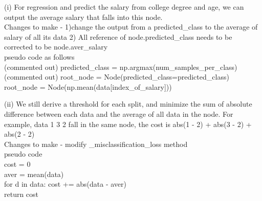 \begin{answer}

(i) 
For regression and predict the salary from college degree and age, we can output the average salary that falls into this node. \\

Changes to make - 1)change the output from a predicted\_class to the average of salary of all its data 2) All reference of node.predicted\_class needs to be corrected to be node.aver\_salary \\
pseudo code as follows\\
    \hspace{10mm} (commented out) predicted\_class = np.argmax(num\_samples\_per\_class) \\
    \hspace{10mm} (commented out) root\_node = Node(predicted\_class=predicted\_class) \\
    root\_node = Node(np.mean(data[index\_of\_salary]))

(ii) 
We still derive a threshold for each split, and minimize the sum of absolute difference between each data and the average of all data in the node. For example, data 1 3 2 fall in the same node, the cost is abs(1 - 2) +  abs(3 - 2) + abs(2 - 2) \\
Changes to make - modify \_misclassification\_loss method \\ 
pseudo code \\
    cost = 0 \\
    aver = mean(data) \\
    for d in data:  cost += abs(data - aver) \\
    return cost
\end{answer}